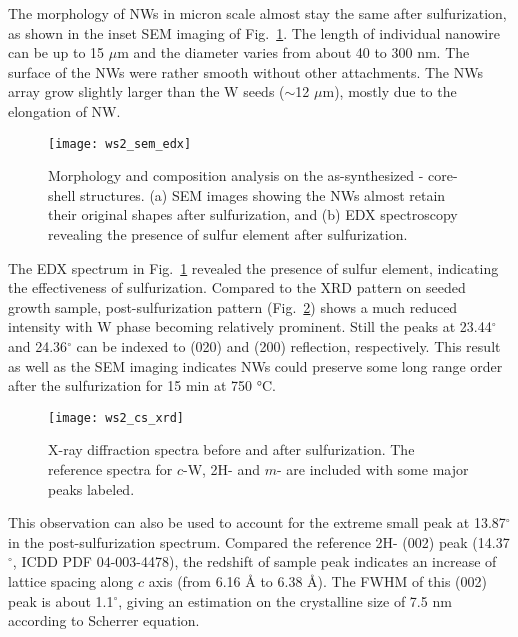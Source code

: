 The morphology of  NWs in micron scale almost stay the same after sulfurization, as shown in the inset SEM imaging of Fig.~\ref{fig:ch5ws2sem}. The length of individual nanowire can be up to 15 $\mu$m and the diameter varies from about 40 to 300 nm. The surface of the NWs were rather smooth without other attachments. The NWs array grow slightly larger than the W seeds ($\sim$12 $\mu$m), mostly due to the elongation of NW.
\begin{figure}[htb]
\centering
\texttt{[image: ws2\_sem\_edx]}
\caption[Morphology and composition analysis on the as-synthesized - core-shell structures]{Morphology and composition analysis on the as-synthesized - core-shell structures. (a) SEM images showing the NWs almost retain their original shapes after sulfurization, and (b) EDX spectroscopy revealing the presence of sulfur element after sulfurization.}
\label{fig:ch5ws2sem}
\end{figure}
The EDX spectrum in Fig.~\ref{fig:ch5ws2sem} revealed the presence of sulfur element, indicating the effectiveness of sulfurization. Compared to the XRD pattern on seeded growth  sample, post-sulfurization pattern (Fig.~\ref{fig:ch5ws2xrd}) shows a much reduced  intensity with W phase becoming relatively prominent. Still the peaks at 23.44$^{\circ}$ and 24.36$^{\circ}$ can be indexed to  (020) and (200) reflection, respectively. This result as well as the SEM imaging indicates  NWs could preserve some long range order after the sulfurization for 15 min at 750 \si{\degreeCelsius}. 
\begin{figure}[htb]
\centering
\texttt{[image: ws2\_cs\_xrd]}
\caption[X-ray diffraction spectra before and after sulfurization]{X-ray diffraction spectra before and after sulfurization. The reference spectra for $c$-W, 2H- and $m$- are included with some major peaks labeled.}
\label{fig:ch5ws2xrd}
\end{figure}
This observation can also be used to account for the extreme small peak at 13.87$^{\circ}$ in the post-sulfurization spectrum. Compared the reference 2H- (002) peak (14.37$^{\circ}$, ICDD PDF 04-003-4478), the redshift of sample peak indicates an increase of lattice spacing along $c$ axis (from 6.16 \si{\angstrom} to 6.38 \si{\angstrom}). The FWHM of this (002) peak is about 1.1$^{\circ}$, giving an estimation on the crystalline size of 7.5 nm according to Scherrer equation. 

